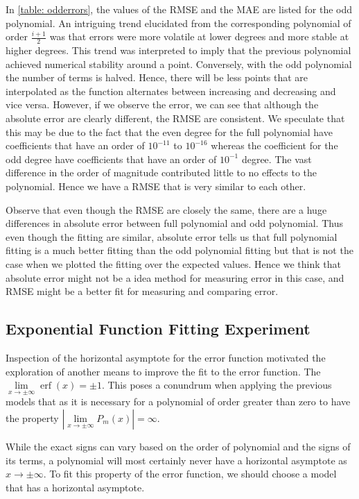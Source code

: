 \documentclass[10pt,a4paper]{article}
\DeclareMathOperator\erf{erf}
\begin{document}
In \cref{table: odderrors}, the values of the RMSE and the MAE are listed for the odd polynomial. An intriguing trend elucidated from the corresponding polynomial of order $\frac{i+1}{2}$ was that errors were more volatile at lower degrees and more stable at higher degrees. This trend was interpreted to imply that the previous polynomial achieved numerical stability around a point. Conversely, with the odd polynomial the number of terms is halved. Hence, there will be less points that are interpolated as the function alternates between increasing and decreasing and vice versa. However, if we observe the error, we can see that although the absolute error are clearly different, the RMSE are consistent. We speculate that this may be due to the fact that the even degree for the full polynomial have coefficients that have an order of $10^{-11}$ to $10^{-16}$ whereas the coefficient for the odd degree have coefficients that have an order of $10^{-1}$ degree. The vast difference in the order of magnitude contributed little to no effects to the polynomial. Hence we have a RMSE that is very similar to each other.

Observe that even though the RMSE are closely the same, there are a huge differences in absolute error between full polynomial and odd polynomial. Thus even though the fitting are similar, absolute error tells us that full polynomial fitting is a much better fitting than the odd polynomial fitting but that is not the case when we plotted the fitting over the expected values. Hence we think that absolute error might not be a idea method for measuring error in this case, and RMSE might be a better fit for measuring and comparing error.

\subsection*{Exponential Function Fitting Experiment}

Inspection of the horizontal asymptote for the error function motivated the exploration of another means to improve the fit to the error function. The $\lim\limits_{x \to \pm \infty} \erf{(x)} = \pm1$. This poses a conundrum when applying the previous models that as it is necessary for a polynomial of order greater than zero to have the property $\left| \lim\limits_{x \to \pm \infty} P_m(x)  \right| = \infty$. 

While the exact signs can vary based on the order of polynomial and the signs of its terms, a polynomial will most certainly never have a horizontal asymptote as $x \to \pm \infty$. To fit this property of the error function, we should choose a model that has a horizontal asymptote.
\end{document}
